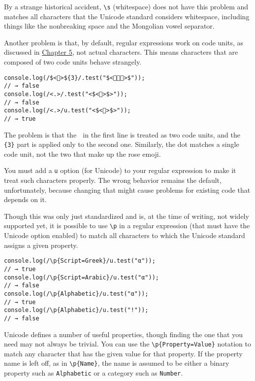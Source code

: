 By a strange historical accident, \lstinline`\s` (whitespace) does not have this problem and matches all characters that the Unicode standard considers whitespace, including things like the nonbreaking space and the Mongolian vowel separator.

Another problem is that, by default, regular expressions work on code units, as discussed in \hyperref[higher_order.code_units]{Chapter 5}, not actual characters. This means characters that are composed of two code units behave strangely.

\begin{lstlisting}
console.log(/$<🍎>${3}/.test("$<🍎🍎🍎>$"));
// → false
console.log(/<.>/.test("<$<🌹>$>"));
// → false
console.log(/<.>/u.test("<$<🌹>$>"));
// → true
\end{lstlisting}
\noindent

The problem is that the 🍎 in the first line is treated as two code units, and the \lstinline`{3}` part is applied only to the second one. Similarly, the dot matches a single code unit, not the two that make up the rose emoji.

You must add a \lstinline`u` option (for Unicode) to your regular expression to make it treat such characters properly. The wrong behavior remains the default, unfortunately, because changing that might cause problems for existing code that depends on it.

Though this was only just standardized and is, at the time of writing, not widely supported yet, it is possible to use \lstinline`\p` in a regular expression (that must have the Unicode option enabled) to match all characters to which the Unicode standard assigns a given property.

\begin{lstlisting}
console.log(/\p{Script=Greek}/u.test("α"));
// → true
console.log(/\p{Script=Arabic}/u.test("α"));
// → false
console.log(/\p{Alphabetic}/u.test("α"));
// → true
console.log(/\p{Alphabetic}/u.test("!"));
// → false
\end{lstlisting}
\noindent

Unicode defines a number of useful properties, though finding the one that you need may not always be trivial. You can use the \lstinline`\p{Property=Value}` notation to match any character that has the given value for that property. If the property name is left off, as in \lstinline`\p{Name}`, the name is assumed to be either a binary property such as \lstinline`Alphabetic` or a category such as \lstinline`Number`.

